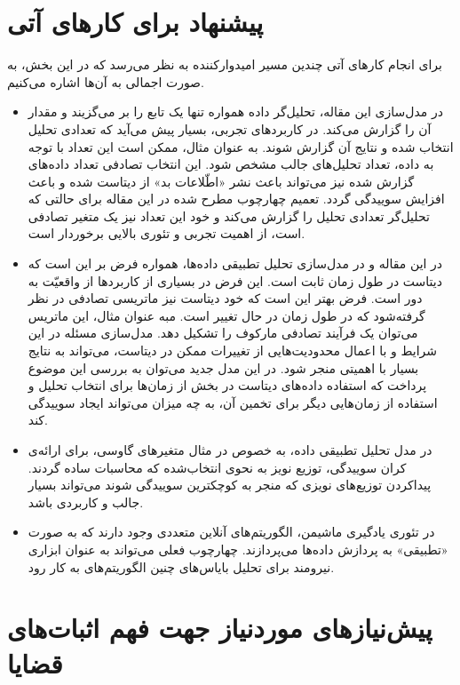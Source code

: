 \documentclass[a4paper,12pt]{article}
\begin{document}
\section{پیشنهاد برای کار‌های آتی}
برای انجام کار‌های آتی چندین مسیر امیدوار‌کننده به نظر می‌رسد که در این بخش، به صورت اجمالی به آن‌ها اشاره می‌کنیم.
\begin{itemize}
	\item 
در مدل‌سازی این مقاله، تحلیل‌گر داده همواره تنها یک تابع را بر می‌گزیند و مقدار آن را گزارش می‌کند. در کاربرد‌‌های تجربی، بسیار پیش‌ می‌آید که تعدادی تحلیل انتخاب شده و نتایج آن گزارش شوند. به عنوان مثال، ممکن است این تعداد با توجه به داده، تعداد تحلیل‌های جالب مشخص شود. این انتخاب تصادفی تعداد داده‌های گزارش شده نیز می‌تواند باعث نشر «اطّلاعات بد» از دیتاست شده و باعث افزایش سوییدگی گردد. تعمیم چهارچوب مطرح شده در این مقاله برای حالتی که تحلیل‌گر تعدادی تحلیل را گزارش می‌کند و خود این تعداد نیز یک متغیر تصادفی است، از اهمیت تجربی و تئوری بالایی برخوردار است.

\item
در این مقاله و در مدل‌سازی تحلیل تطبیقی داده‌ها، همواره فرض بر این است که دیتاست در طول زمان ثابت است. این فرض در بسیاری از کاربرد‌ها از واقعیّت به دور است. فرض بهتر این است که خود دیتاست نیز ماتریسی ‌تصادفی در نظر گرفته‌شود که در طول زمان در حال تغییر است. مبه عنوان مثال، این ماتریس می‌توان یک فرآیند تصادفی مارکوف را تشکیل دهد. مدل‌سازی مسئله در این شرایط و با اعمال محدودیت‌هایی از تغییرات ممکن در دیتاست، می‌تواند به نتایج بسیار با اهمیتی منجر شود. در این مدل جدید می‌توان به بررسی این موضوع پرداخت که استفاده داده‌های دیتاست در بخش از زمان‌ها  برای انتخاب تحلیل و استفاده از زمان‌هایی دیگر برای تخمین آن، به چه میزان می‌تواند ایجاد سوییدگی کند.

\item
در مدل تحلیل تطبیقی داده، به خصوص در مثال متغیر‌های گاوسی، برای ارائه‌ی کران سوییدگی، توزیع نویز به نحوی انتخاب‌شده که محاسبات ساده گردند. پیدا‌کردن توزیع‌های نویزی که منجر به کوچکترین سوییدگی شوند می‌تواند بسیار جالب و کاربردی باشد.

\item 
در تئوری یادگیری ماشیمن، الگوریتم‌های آنلاین متعددی وجود دارند که به صورت «تطبیقی» به پردازش داده‌ها می‌پردازند. چهارچوب فعلی می‌تواند به عنوان ابزاری نیرومند برای تحلیل بایاس‌های چنین الگوریتم‌های به کار رود.
\end{itemize}

	
	
	\clearpage
	\appendix
	\section{پیش‌نیازهای موردنیاز جهت فهم اثبات‌های قضایا}\label{pre_requirements}
\end{document}
